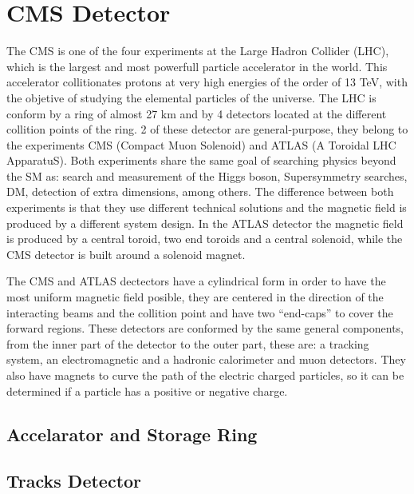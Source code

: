 \chapter{CMS Detector}

The CMS is one of the four experiments at the Large Hadron Collider (LHC), which is the largest and most powerfull particle accelerator in the world. This accelerator collitionates protons at very high energies of the order of 13 TeV, with the objetive of studying the elemental particles of the universe. 
The LHC is conform by a ring of almost 27 km and by 4 detectors located at the different collition points of the ring. 2 of these detector are general-purpose, they belong to the experiments CMS (Compact Muon Solenoid) and ATLAS (A Toroidal LHC ApparatuS). Both experiments share the same goal of searching physics beyond the SM as: search and measurement of the Higgs boson, Supersymmetry searches, DM, detection of extra dimensions, among others. The difference between both experiments is that they use different technical solutions and the magnetic field is produced by a different system design. In the ATLAS detector the magnetic field is produced by a central toroid, two end toroids and a central solenoid, while the CMS detector is built around a solenoid magnet.  

The CMS and ATLAS dectectors have a cylindrical form in order to have the most uniform magnetic field posible, they are centered in the direction of the interacting beams and the collition point and have two ``end-caps'' to cover the forward regions. These detectors are conformed by the same general components, from the inner part of the detector to the outer part, these are: a tracking system, an electromagnetic and a hadronic calorimeter and muon detectors. They also have magnets to curve the path of the electric charged particles, so it can be determined if a particle has a positive or negative charge.  

\section{Accelarator and Storage Ring}


\section{Tracks Detector}

